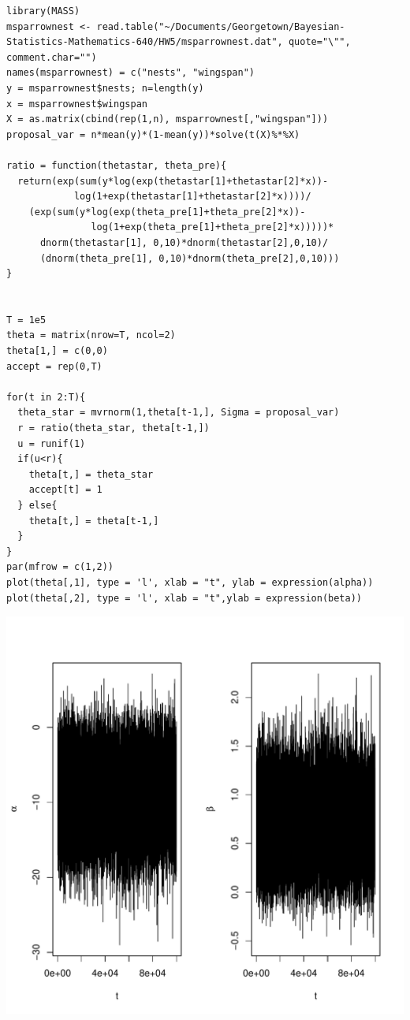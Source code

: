 \documentclass{article}\usepackage[]{graphicx}\usepackage[]{color}
\makeatletter
\newenvironment{kframe}{%
 \def\at@end@of@kframe{}%
 \ifinner\ifhmode%
  \def\at@end@of@kframe{\end{minipage}}%
  \begin{minipage}{\columnwidth}%
 \fi\fi%
 \def\FrameCommand##1{\hskip\@totalleftmargin \hskip-\fboxsep
 \colorbox{shadecolor}{##1}\hskip-\fboxsep
     \hskip-\linewidth \hskip-\@totalleftmargin \hskip\columnwidth}%
 \MakeFramed {\advance\hsize-\width
   \@totalleftmargin\z@ \linewidth\hsize
   \@setminipage}}%
 {\par\unskip\endMakeFramed%
 \at@end@of@kframe}
\newenvironment{knitrout}{}{} %
\makeatother
\begin{document}
\begin{knitrout}
\color{fgcolor}\begin{kframe}
\begin{verbatim}
library(MASS)
msparrownest <- read.table("~/Documents/Georgetown/Bayesian-Statistics-Mathematics-640/HW5/msparrownest.dat", quote="\"", comment.char="")
names(msparrownest) = c("nests", "wingspan")
y = msparrownest$nests; n=length(y)
x = msparrownest$wingspan
X = as.matrix(cbind(rep(1,n), msparrownest[,"wingspan"]))
proposal_var = n*mean(y)*(1-mean(y))*solve(t(X)%*%X)

ratio = function(thetastar, theta_pre){
  return(exp(sum(y*log(exp(thetastar[1]+thetastar[2]*x))-
            log(1+exp(thetastar[1]+thetastar[2]*x))))/
    (exp(sum(y*log(exp(theta_pre[1]+theta_pre[2]*x))-
               log(1+exp(theta_pre[1]+theta_pre[2]*x)))))*
      dnorm(thetastar[1], 0,10)*dnorm(thetastar[2],0,10)/
      (dnorm(theta_pre[1], 0,10)*dnorm(theta_pre[2],0,10)))
}
  

T = 1e5
theta = matrix(nrow=T, ncol=2)
theta[1,] = c(0,0)
accept = rep(0,T)

for(t in 2:T){
  theta_star = mvrnorm(1,theta[t-1,], Sigma = proposal_var)
  r = ratio(theta_star, theta[t-1,])
  u = runif(1)
  if(u<r){
    theta[t,] = theta_star
    accept[t] = 1
  } else{
    theta[t,] = theta[t-1,]
  }
}
par(mfrow = c(1,2))
plot(theta[,1], type = 'l', xlab = "t", ylab = expression(alpha))
plot(theta[,2], type = 'l', xlab = "t",ylab = expression(beta))
\end{verbatim}
\end{kframe}
\includegraphics[width=1\linewidth]{figure/unnamed-chunk-9-1} 

\end{knitrout}
\end{document}
